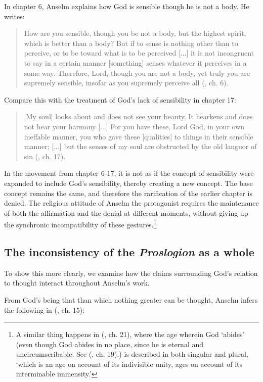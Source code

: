 \documentclass[]{birkjour}
\begin{document}
In chapter 6, Anselm explains how God is sensible though he is not a body. He writes:

\begin{quote}
How are you sensible, though you be not a body, but the highest spirit, which is better than a body? But if to sense is nothing other than to perceive, or to be toward what is to be perceived [...] it is not incongruent to say in a certain manner [something] senses whatever it perceives in a some way. Therefore, Lord, though you are not a body, yet truly you are supremely sensible, insofar as you supremely perceive all (\cite{AnselmPros}, ch. 6).
\end{quote}
Compare this with the treatment of God's lack of sensibility in chapter 17:

\begin{quote}
[My soul] looks about and does not see your beauty. It hearkens and does not hear your harmony [...] For you have these, Lord God, in your own ineffable manner, you who gave these [qualities] to things in their sensible manner; [...] but the senses of my soul are obstructed by the old languor of sin (\cite{AnselmPros}, ch. 17).
\end{quote}

In the movement from chapter 6-17, it is not as if the concept of sensibility were expanded to include God's sensibility, thereby creating a new concept. The base concept remains the same, and therefore the rarification of the earlier chapter is denied. The religious attitude of Anselm the protagonist requires the maintenance of both the affirmation and the denial at different moments, without giving up the synchronic incompatibility of these gestures.\footnote{A similar thing happens in (\cite{AnselmPros}, ch. 21), where the age wherein God `abides' (even though God abides in no place, since he is eternal and uncircumscribable. See (\cite{AnselmPros}, ch. 19).)  is described in both singular and plural, `which is an age on account of its indivisible unity, ages on account of its interminable immensity.'} 
\subsection{The inconsistency of the \textit{Proslogion} as a whole}
To show this more clearly, we examine how the claims surrounding God's relation to thought interact throughout Anselm's work. 

From God's being that than which nothing greater can be thought, Anselm infers the following in (\cite{AnselmPros}, ch. 15):
\end{document}
